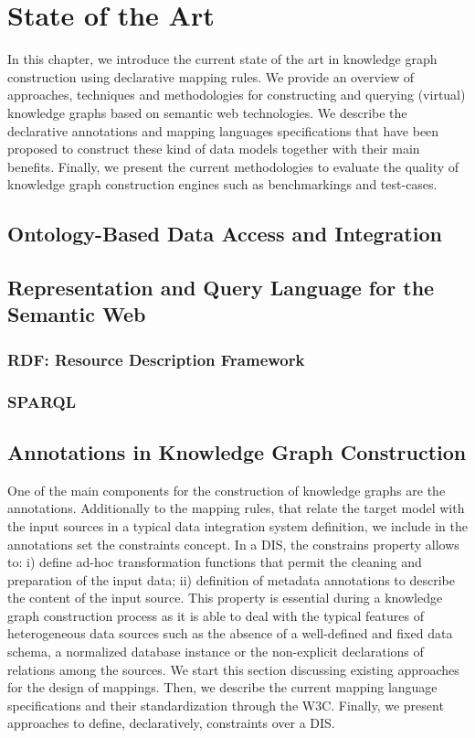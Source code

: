 \chapter{State of the Art}
\label{chap:soa}

In this chapter, we introduce the current state of the art in knowledge graph construction using declarative mapping rules. We provide an overview of approaches, techniques and methodologies for constructing and querying (virtual) knowledge graphs based on semantic web technologies. We describe the declarative annotations and mapping languages specifications that have been proposed to construct these kind of data models together with their main benefits. Finally, we present the current methodologies to evaluate the quality of knowledge graph construction engines such as benchmarkings and test-cases.


\section{Ontology-Based Data Access and Integration}


\section{Representation and Query Language for the Semantic Web}

\subsection{RDF: Resource Description Framework}

\subsection{SPARQL}




\section{Annotations in Knowledge Graph Construction}
One of the main components for the construction of knowledge graphs are the annotations. Additionally to the mapping rules, that relate the target model with the input sources in a typical data integration system definition, we include in the annotations set the constraints concept. In a DIS, the constrains property allows to: i) define ad-hoc transformation functions that permit the cleaning and preparation of the input data; ii) definition of metadata annotations to describe the content of the input source. This property is essential during a knowledge graph construction process as it is able to deal with the typical features of heterogeneous data sources such as the absence of a well-defined and fixed data schema, a normalized database instance or the non-explicit declarations of relations among the sources. We start this section discussing existing approaches for the design of mappings. Then, we describe the current mapping language specifications and their standardization through the W3C. Finally, we present approaches to define, declaratively, constraints over a DIS.

